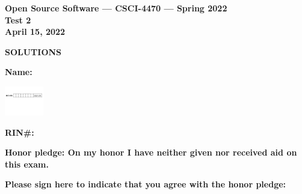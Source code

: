 \documentclass[10pt]{article}
\begin{document}
\thispagestyle{empty}

\vspace*{0.5in}

\begin{center}
\Large
\textbf{Open Source Software --- CSCI-4470 --- Spring 2022} \\
\textbf{Test 2} \\
\textbf{April 15, 2022}
\end{center}


\beginanswers
\begin{center}
\Large
\textbf{SOLUTIONS}
\end{center}

\else


\begin{center}

\textbf{\Large Name:} \underline {\hspace{2.0in}} \\

\bigskip
\bigskip

\centerline{
\includegraphics[height=0.5in]{boxes}
}


\bigskip

\textbf{\Large RIN\#:} \underline {\hspace{1.5in}}  

\vspace*{0.4in}
{\large\bf Honor pledge: On my honor I have neither given
nor received aid on this exam.}

\vspace*{0.1in}
{\large\bf Please sign here to indicate that you agree with the honor pledge: \underline {\hspace{1.5in}}}
\end{center}
\end{document}
